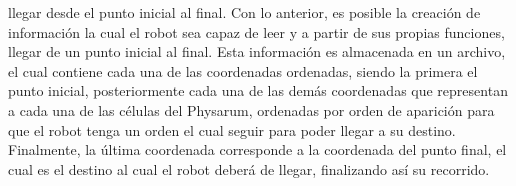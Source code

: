         llegar desde el punto inicial al final.
    \vskip 0.5cm
    Con lo anterior, es posible la creaci\'on de informaci\'on la cual
        el robot sea capaz de leer y a partir de sus propias funciones,
        llegar de un punto inicial al final. Esta informaci\'on es
        almacenada en un archivo, el cual contiene cada una de las
        coordenadas ordenadas, siendo la primera el punto inicial,
        posteriormente cada una de las dem\'as coordenadas que
        representan a cada una de las c\'elulas del Physarum,
        ordenadas por orden de aparici\'on para que el robot tenga un
        orden el cual seguir para poder llegar a su destino.
    \vskip 0.5cm
    Finalmente, la \'ultima coordenada corresponde a la
        coordenada del punto final, el cual es el destino al cual el
        robot deber\'a de llegar, finalizando as\'i su recorrido.
        
